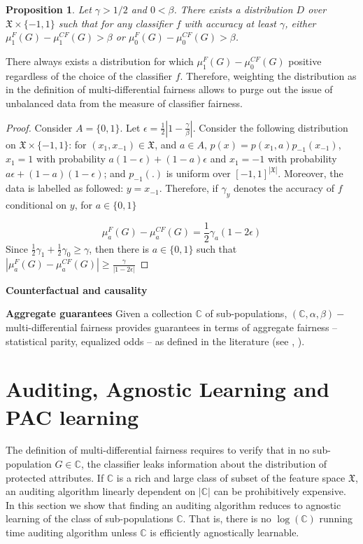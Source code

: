 \documentclass{article}
\newtheorem{prop}[thm]{Proposition}
\begin{document}
\begin{prop}
Let $\gamma > 1/2$ and $0< \beta$. There exists a distribution $D$ over $\mathfrak{X} \times \{-1, 1\}$ such that for any classifier $f$ with accuracy at least $\gamma$, either $\mu^{F}_{1}(G) -\mu^{CF}_{1}(G) > \beta$ or $\mu^{F}_{0}(G) -\mu^{CF}_{0}(G) > \beta$.

\end{prop}
There always exists a distribution for which 
$\mu^{F}_{1}(G) -\mu^{CF}_{0}(G)$ positive regardless of the choice of the classifier $f$. Therefore, weighting the distribution as in the definition of multi-differential fairness allows to purge out the issue of unbalanced data from the measure of classifier fairness. 


\begin{proof}
Consider $A=\{0,1\}$. Let $\epsilon=\frac{1}{2}\left|1-\frac{\gamma}{\beta}\right|$. Consider the following distribution on $\mathfrak{X}\times \{-1, 1\}$: for $(x_{1}, x_{-1})\in \mathfrak{X}$, and $a\in A$, $p(x)= p(x_{1}, a)p_{-1}(x_{-1})$, $x_{1}=1$ with probability $a(1-\epsilon) + (1-a)\epsilon$ and $x_{1}=-1$ with probability $a\epsilon + (1-a)(1-\epsilon)$; and $p_{-1}(.)$ is uniform over $[-1, 1]^{|\mathfrak{X}|}$. Moreover, the data is labelled as followed: $y=x_{-1}$. Therefore, if $\gamma_{y}$ denotes the accuracy of $f$ conditional on $y$, for $a\in \{0,1\}$

\begin{equation}
    \mu^{F}_{a}(G) -\mu^{CF}_{a}(G) = \frac{1}{2} \gamma_{a} (1-2\epsilon)
\end{equation}
Since $\frac{1}{2}\gamma_{1} + \frac{1}{2}\gamma_{0} \geq \gamma$, then there is $a\in \{0, 1\}$ such that $|\mu^{F}_{a}(G) -\mu^{CF}_{a}(G)|\geq \frac{\gamma}{|1-2\epsilon|}$
\end{proof}

\textbf{Counterfactual and causality}


\textbf{Aggregate guarantees}
Given a collection $\mathbb{C}$ of sub-populations, $(\mathbb{C}, \alpha, \beta)-$ multi-differential fairness provides guarantees in terms of aggregate fairness -- statistical parity, equalized odds -- as defined in the literature (see \citet{hardt2016equality}, \citet{dwork2012fairness}). 

\section{Auditing, Agnostic Learning and PAC learning}

The definition of multi-differential fairness requires to verify that in no sub-population $G\in \mathbb{C}$, the classifier leaks information about the distribution of protected attributes. If $\mathbb{C}$ is a rich and large class of subset of the feature space $\mathfrak{X}$, an auditing algorithm linearly dependent on $|\mathbb{C}|$ can be prohibitively expensive. In this section we show that finding an auditing algorithm reduces to agnostic learning of the class of sub-populations $\mathbb{C}$. That is, there is no $\log(\mathbb{C})$ running time auditing algorithm unless $\mathbb{C}$ is efficiently agnostically learnable.  
\end{document}
